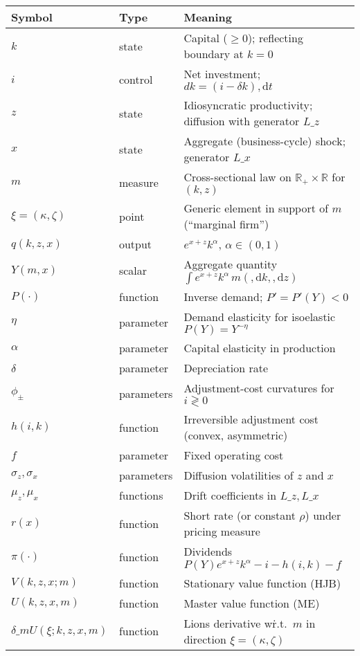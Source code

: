 \documentclass[11pt,letterpaper,oneside]{article}
\numberwithin{equation}{section}
\newcommand{\R}{\mathbb{R}}
\newcommand{\1}{\mathbf{1}}
\newcommand{\diff}{,\mathrm{d}}
\newcommand{\Lz}{L\_z}
\newcommand{\Lx}{L\_x}
\newcommand{\dmU}{\delta\_m U}
\begin{document}
\begin{table}[!ht]
\centering
\small
\begin{tabular}{@{} l l p{}}
\toprule
\textbf{Symbol} & \textbf{Type} & \textbf{Meaning} \\
\midrule
$k$ & state & Capital ($\ge 0$); reflecting boundary at $k=0$ \\
$i$ & control & Net investment; $dk=(i-\delta k)\diff t$ \\
$z$ & state & Idiosyncratic productivity; diffusion with generator $\Lz$ \\
$x$ & state & Aggregate (business-cycle) shock; generator $\Lx$ \\
$m$ & measure & Cross-sectional law on $\R_+\times\R$ for $(k,z)$ \\
$\xi=(\kappa,\zeta)$ & point & Generic element in support of $m$ (``marginal firm'') \\
$q(k,z,x)$ & output & $e^{x+z}k^\alpha$, $\alpha\in(0,1)$ \\
$Y(m,x)$ & scalar & Aggregate quantity $\int e^{x+z}k^\alpha\,m(\diff k,\diff z)$ \\
$P(\cdot)$ & function & Inverse demand; $P'=P'(Y)<0$ \\
$\eta$ & parameter & Demand elasticity for isoelastic $P(Y)=Y^{-\eta}$ \\
$\alpha$ & parameter & Capital elasticity in production \\
$\delta$ & parameter & Depreciation rate \\
$\phi_\pm$ & parameters & Adjustment-cost curvatures for $i\gtrless 0$ \\
$h(i,k)$ & function & Irreversible adjustment cost (convex, asymmetric) \\
$f$ & parameter & Fixed operating cost \\
$\sigma_z,\sigma_x$ & parameters & Diffusion volatilities of $z$ and $x$ \\
$\mu_z,\mu_x$ & functions & Drift coefficients in $\Lz,\Lx$ \\
$r(x)$ & function & Short rate (or constant $\rho$) under pricing measure \\
$\pi(\cdot)$ & function & Dividends $P(Y)e^{x+z}k^\alpha - i - h(i,k) - f$ \\
$V(k,z,x;m)$ & function & Stationary value function (HJB) \\
$U(k,z,x,m)$ & function & Master value function (ME) \\
$\dmU(\xi;k,z,x,m)$ & function & Lions derivative w\.r.t.\ $m$ in direction $\xi=(\kappa,\zeta)$ \\

\end{tabular}
\end{table}
\end{document}
